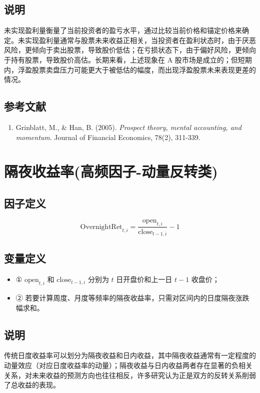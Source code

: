 \documentclass{article}
\begin{document}
\subsection{说明}
未实现盈利量衡量了当前投资者的盈亏水平，通过比较当前价格和锚定价格来确定。未实现盈利量通常与股票未来收益正相关，当投资者在盈利状态时，由于厌恶风险，更倾向于卖出股票，导致股价低估；在亏损状态下，由于偏好风险，更倾向于持有股票，导致股价高估。长期来看，上述现象在 A 股市场是成立的；但短期内，浮盈股票卖盘压力可能更大于被低估的幅度，而出现浮盈股票未来表现更差的情况。

\subsection{参考文献}
\begin{enumerate}
    \item Grinblatt, M., \& Han, B. (2005). \textit{Prospect theory, mental accounting, and momentum}. Journal of Financial Economics, 78(2), 311-339.
\end{enumerate}

\section{隔夜收益率(高频因子-动量反转类)}

\subsection{因子定义}
\begin{equation}
    \mathrm{OvernightRet}_{t,i} = \frac{\mathrm{open}_{t,i}}{\mathrm{close}_{t-1,i}} - 1
\end{equation}

\subsection{变量定义}
\begin{itemize}
    \item ① \( \mathrm{open}_{t,i} \) 和 \( \mathrm{close}_{t-1,i} \) 分别为 \( t \) 日开盘价和上一日 \( t-1 \) 收盘价；
    \item ② 若要计算周度、月度等频率的隔夜收益率，只需对区间内的日度隔夜涨跌幅求和。
\end{itemize}

\subsection{说明}
传统日度收益率可以划分为隔夜收益和日内收益，其中隔夜收益通常有一定程度的动量效应（对应日度收益率的动量）；隔夜收益与日内收益两者存在显著的负相关关系，对未来收益的预测方向也往往相反，许多研究认为正是双方的反转关系削弱了总收益的表现。
\end{document}
